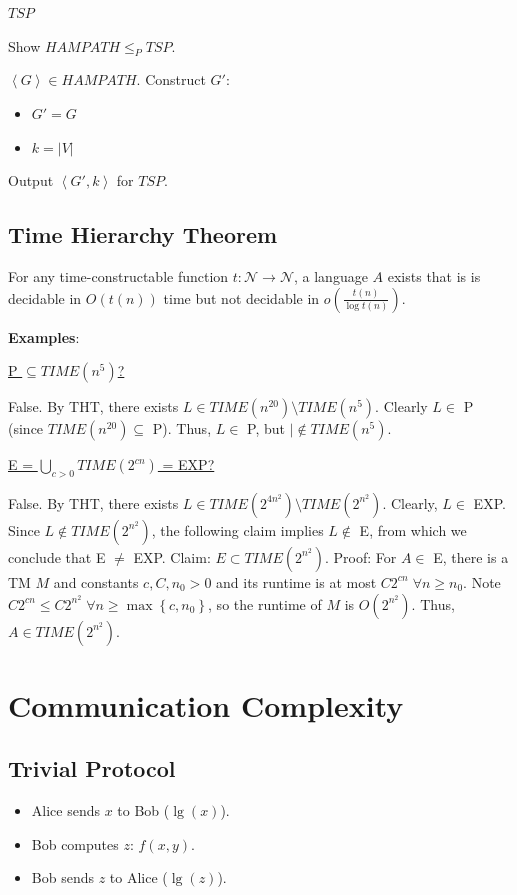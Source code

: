 \documentclass[10pt,landscape,a4paper]{article}
\newcommand{\set}[1]{\left \{ #1 \right \}}
\newcommand{\abs}[1]{\left | #1 \right |}
\newcommand{\encoding}[1]{\left \langle #1 \right \rangle}
\begin{document}
\begin{multicols*}{3}
\underline{$TSP$}

Show $HAMPATH \leq_P TSP$.

$\encoding{G} \in HAMPATH$. Construct $G'$:

\begin{itemize}
    \item $G' = G$
    \item $k = \abs{V}$
\end{itemize}

Output $\encoding{G', k}$ for $TSP$.

\subsection{Time Hierarchy Theorem}

For any time-constructable function $t: \mathcal{N} \rightarrow \mathcal{N}$, a language $A$ exists that is is decidable in $O(t(n))$ time but not decidable in $o(\frac{t(n)}{\log{t(n)}})$.

\textbf{Examples}:

\underline{P $\subseteq TIME(n^5)$?}

False. By THT, there exists $L \in TIME(n^{20}) \setminus TIME(n^5)$. Clearly $L \in$ P (since $TIME(n^{20}) \subseteq$ P). Thus, $L \in$ P, but $| \notin TIME(n^5)$.

\underline{E = $\bigcup_{c > 0} TIME(2^{cn})$ = EXP?}

False. By THT, there exists $L \in TIME(2^{4n^2}) \setminus TIME(2^{n^2})$. Clearly, $L \in$ EXP. Since $L \notin TIME(2^{n^2})$, the following claim implies $L \notin$ E, from which we conclude that E $\neq$ EXP. Claim: $E \subset TIME(2^{n^2})$. Proof: For $A \in $ E, there is a TM $M$ and constants $c, C, n_0 >0$ and its runtime is at most $C2^{cn} \; \forall n \geq n_0$. Note $C2^{cn} \leq C2^{n^2} \; \forall n \geq \max \set{c, n_0}$, so the runtime of $M$ is $O(2^{n^2})$. Thus, $A \in TIME(2^{n^2})$.

\section{Communication Complexity}

\subsection{Trivial Protocol}

\begin{itemize}
    \item Alice sends $x$ to Bob ($\lg(x)$).
    \item Bob computes $z$: $f(x, y)$.
    \item Bob sends $z$ to Alice ($\lg(z)$).
\end{itemize}


\end{multicols*}
\end{document}
